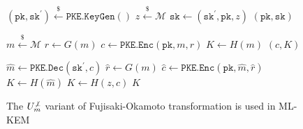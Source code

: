 \documentclass[journal=tches,submission]{iacrtrans}
\newcommand{\keygen}{\texttt{KeyGen}}
\newcommand{\kem}{\texttt{KEM}}
\newcommand{\encap}{\texttt{Encap}}
\newcommand{\decap}{\texttt{Decap}}
\newcommand{\pk}{\texttt{pk}}
\newcommand{\sk}{\texttt{sk}}
\newcommand{\leftsample}{\stackrel{\$}{\leftarrow}}
\begin{document}
\begin{figure}
    \centering

    \begin{minipage}[t]{0.34\textwidth}
        \begin{algorithm}[H]
            \caption*{$\kem^{\not\bot}_m.\keygen()$}
            \begin{algorithmic}[1]
                \State $(\pk, \sk^\prime) \leftsample \texttt{PKE.KeyGen}()$
                \State $z \leftsample \mathcal{M}$
                \State $\sk \leftarrow (\sk^\prime, \pk, z)$
                \State \Return $(\pk, \sk)$
            \end{algorithmic}
        \end{algorithm}
    \end{minipage}
    \begin{minipage}[t]{0.3\textwidth}
        \begin{algorithm}[H]
            \caption*{$\kem^{\not\bot}_m.\encap(\pk)$}
            \begin{algorithmic}[1]
                \State $m \leftsample \mathcal{M}$
                \State $r \leftarrow G(m)$
                \State $c \leftarrow \texttt{PKE.Enc}(\pk, m ,r)$
                \State $K \leftarrow H(m)$
                \State \Return $(c, K)$
            \end{algorithmic}
        \end{algorithm}
    \end{minipage}
    \begin{minipage}[t]{0.3\textwidth}
        \begin{algorithm}[H]
            \caption*{$\kem^{\not\bot}_m.\decap(\sk, c)$}
            \begin{algorithmic}[1]
                \State $\hat{m} \leftarrow \texttt{PKE.Dec}(\sk^\prime, c)$
                \State $\hat{r} \leftarrow G(m)$
                \State $\hat{c} \leftarrow \texttt{PKE.Enc}(\pk, \hat{m}, \hat{r})$
                    \State $K \leftarrow H(\hat{m})$
                \Else
                    \State $K \leftarrow H(z, c)$
                \EndIf
                \State \Return $K$
            \end{algorithmic}
        \end{algorithm}
    \end{minipage}

    \caption{The $U^{\not\bot}_m$ variant of Fujisaki-Okamoto transformation is used in ML-KEM}\label{fig:u-notbot-m-routines}
\end{figure}
\end{document}
